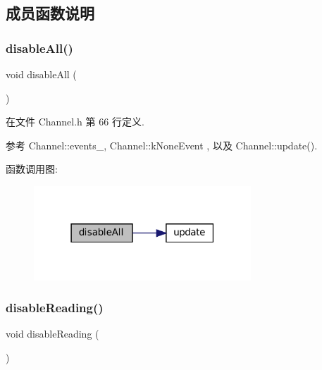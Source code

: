 \subsection{成员函数说明}
\mbox{\label{classmuduo_1_1net_1_1Channel_a238885c747f586049b766fa4fcd5ec12}} 
\subsubsection{\texorpdfstring{disable\+All()}{disableAll()}}
{\footnotesize\ttfamily void disable\+All (\begin{DoxyParamCaption}{ }\end{DoxyParamCaption})\hspace{0.3cm}{\ttfamily [inline]}}



在文件 Channel.\+h 第 66 行定义.



参考 Channel\+::events\+\_\+, Channel\+::k\+None\+Event , 以及 Channel\+::update().

函数调用图\+:
\nopagebreak
\begin{figure}[H]
\begin{center}
\leavevmode
\includegraphics[width=231pt]{classmuduo_1_1net_1_1Channel_a238885c747f586049b766fa4fcd5ec12_cgraph}
\end{center}
\end{figure}
\mbox{\label{classmuduo_1_1net_1_1Channel_aa27263032d6b3a79edb4e99537293c37}} 
\subsubsection{\texorpdfstring{disable\+Reading()}{disableReading()}}
{\footnotesize\ttfamily void disable\+Reading (\begin{DoxyParamCaption}{ }\end{DoxyParamCaption})\hspace{0.3cm}{\ttfamily [inline]}}



